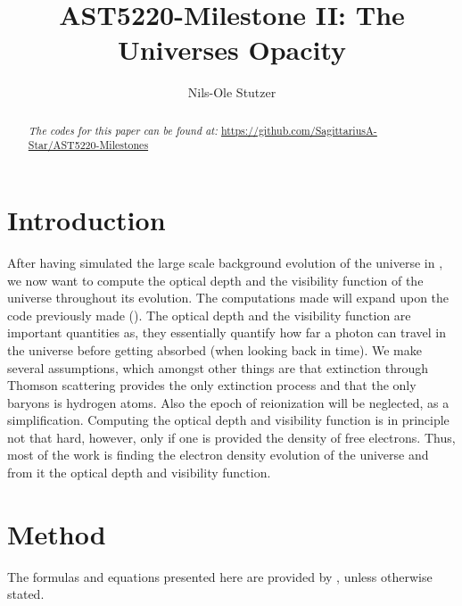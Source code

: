 \documentclass[twocolumn]{aastex62}
\begin{document}
\title{\Large AST5220-Milestone II: The Universes Opacity}

\author{Nils-Ole Stutzer}

\begin{abstract}
    
    \textit{The codes for this paper can be found at:} \newline \url{https://github.com/SagittariusA-Star/AST5220-Milestones}
\end{abstract}

\section{Introduction} \label{sec:Intro}
After having simulated the large scale background evolution of the universe in \cite{stutzer:2020}, we now want to compute the optical depth and the visibility function of the universe throughout its evolution. The computations made will expand upon the code previously made (\cite{stutzer:2020}). The optical depth and the visibility function are important quantities as, they essentially quantify how far a photon can travel in the universe before getting absorbed (when looking back in time). We make several assumptions, which amongst other things are that extinction through Thomson scattering provides the only extinction process and that the only baryons is hydrogen atoms. Also the epoch of reionization will be neglected, as a simplification. Computing the optical depth and visibility function is in principle not that hard, however, only if one is provided the density of free electrons. Thus, most of the work is finding the electron density evolution of the universe and from it the optical depth and visibility function. 

\section{Method} \label{sec:Method}
The formulas and equations presented here are provided by \cite{winther:2020}, unless otherwise stated.
\end{document}
